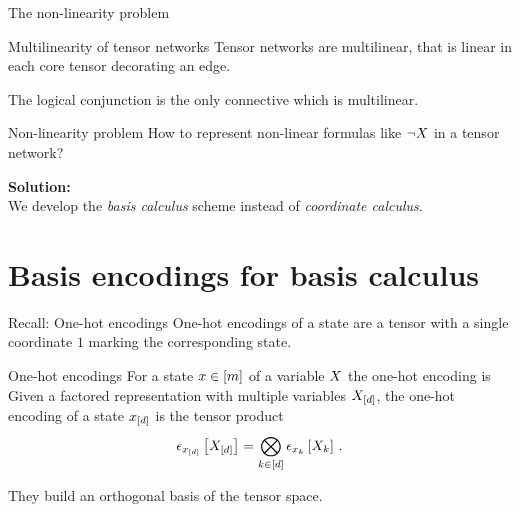 \documentclass{beamer}
\begin{document}
    \begin{frame}{The non-linearity problem}
        \begin{block}{Multilinearity of tensor networks}
            Tensor networks are multilinear, that is linear in each core tensor decorating an edge.
        \end{block}

        The logical conjunction is the only connective which is multilinear.

        \begin{block}{Non-linearity problem}
            How to represent non-linear formulas like $\lnot X$ in a tensor network?
        \end{block}

            {\bf Solution:} \\
        We develop the \emph{basis calculus} scheme instead of \emph{coordinate calculus}.

    \end{frame}


    \section{Basis encodings for basis calculus}

    \begin{frame}{Recall: One-hot encodings}
        One-hot encodings of a state are a tensor with a single coordinate $1$ marking the corresponding state.

        \begin{block}{One-hot encodings}
            For a state $x\in[m]$ of a variable $X$ the one-hot encoding is
            Given a factored representation with multiple variables $X_{[d]}$, the one-hot encoding of a state $x_{[d]}$ is the tensor product
            \begin{align}
                \epsilon_{x_{[d]}}\left[X_{[d]}\right]
                = \bigotimes_{k\in[d]} \epsilon_{x_{k}}\left[X_{k}\right] \, .
            \end{align}
        \end{block}

        They build an orthogonal basis of the tensor space.
    \end{frame}
\end{document}
